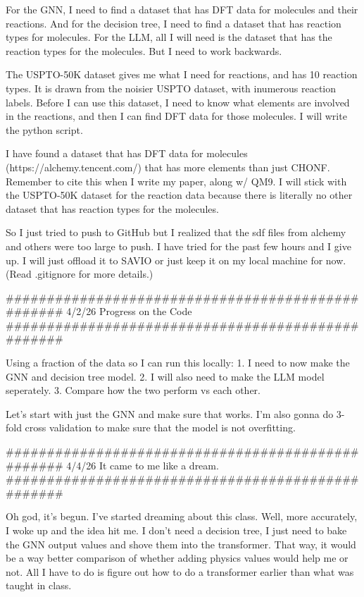 For the GNN, I need to find a dataset that has DFT data for molecules and their reactions. And for the decision tree, I need to find a dataset that has reaction types for molecules.
For the LLM, all I will need is the dataset that has the reaction types for the molecules. But I need to work backwards. 

The USPTO-50K dataset gives me what I need for reactions, and has 10 reaction types. It is drawn from the noisier USPTO dataset, with inumerous reaction labels. 
Before I can use this dataset, I need to know what elements are involved in the reactions, and then I can find DFT data for those molecules. I will write the python script. 

I have found a dataset that has DFT data for molecules (https://alchemy.tencent.com/) that has more elements than just CHONF. Remember to cite this when I write my paper, along w/ QM9. 
I will stick with the USPTO-50K dataset for the reaction data because there is literally no other dataset that has reaction types for the molecules.

So I just tried to push to GitHub but I realized that the sdf files from alchemy and others were too large to push. I have tried for the past few hours and I give up. 
I will just offload it to SAVIO or just keep it on my local machine for now. (Read .gitignore for more details.)

##################################################
4/2/26 Progress on the Code
##################################################

Using a fraction of the data so I can run this locally: 
    1. I need to now make the GNN and decision tree model. 
    2. I will also need to make the LLM model seperately.
    3. Compare how the two perform vs each other.

Let's start with just the GNN and make sure that works. I'm also gonna do 3-fold cross validation to make sure that the model is not overfitting.

##################################################
4/4/26 It came to me like a dream.
##################################################

Oh god, it's begun. I've started dreaming about this class. Well, more accurately, I woke up and the idea hit me. I don't need a decision tree, I just need to bake the GNN output values
and shove them into the transformer. That way, it would be a way better comparison of whether adding physics values would help me or not. All I have to do is figure out how to do a transformer
earlier than what was taught in class. 


